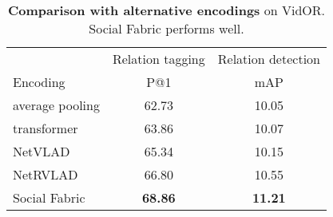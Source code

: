 \documentclass[10pt,twocolumn,letterpaper]{article}
\begin{document}
\begin{table}[t!]
\centering
{}
\caption{\textbf{Importance of two stages} on VidOR. Incorporating Social Fabric into the two stages of our pipeline (third row) is preferred over baselines based on average pooling of features with video snippet proposals (first row) and using Social Fabric only for the proposals (second row).}
\label{tab:stage}
\end{table}


\begin{table}[t]
\centering
\begin{tabular}{lcc}
\toprule
& Relation tagging & Relation detection \\
\cmidrule(lr){2-2} \cmidrule(lr){3-3}
Encoding & P@1 & mAP \\
\midrule
average pooling & 62.73 & 10.05 \\
transformer & 63.86 & 10.07 \\
NetVLAD & 65.34 & 10.15 \\
NetRVLAD & 66.80 & 10.55 \\
\rowcolor{mygray} Social Fabric & \textbf{68.86} & \textbf{11.21} \\
\bottomrule
\end{tabular}
\caption{\textbf{Comparison with alternative encodings} on VidOR. Social Fabric performs well.
}
\label{tab:encodingcompare}
\end{table}
\end{document}
